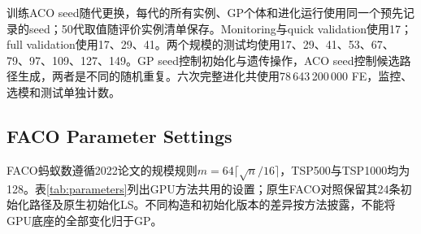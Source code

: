 训练ACO seed随代更换，每代的所有实例、GP个体和进化运行使用同一个预先记录的seed；50代取值随评价实例清单保存。Monitoring与quick validation使用17；full validation使用17、29、41。两个规模的测试均使用17、29、41、53、67、79、97、109、127、149。GP seed控制初始化与遗传操作，ACO seed控制候选路径生成，两者是不同的随机重复。六次完整进化共使用78\,643\,200\,000 FE，监控、选模和测试单独计数。

\subsection{FACO Parameter Settings}
\label{sec:faco-settings}
FACO蚂蚁数遵循2022论文的规模规则$m=64\lceil\sqrt n/16\rceil$\cite{skinderowicz2022}，TSP500与TSP1000均为128。表\ref{tab:parameters}列出GPU方法共用的设置；原生FACO对照保留其24条初始化路径及原生初始化LS。不同构造和初始化版本的差异按方法披露，不能将GPU底座的全部变化归于GP。

